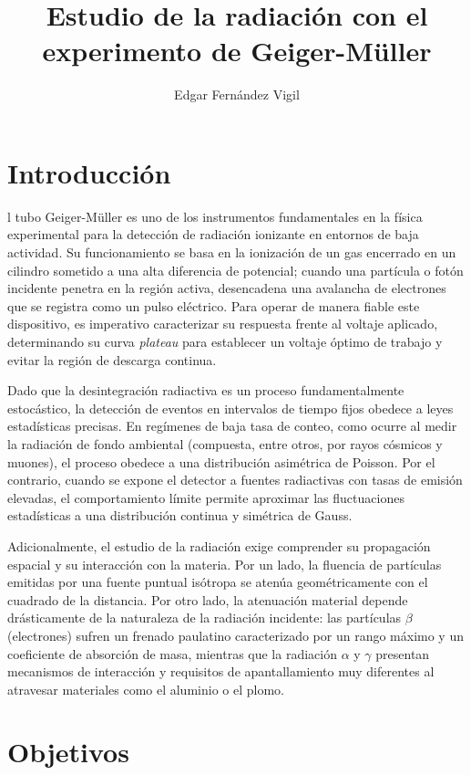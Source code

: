 \documentclass[9pt,a4paper,twocolumn,twoside]{rho-class/rho}
\title{Estudio de la radiación con el experimento de Geiger-Müller}
\author{Edgar Fernández Vigil}
\affil{Física - Facultad de Ciencias - Universidad de Oviedo}
\begin{document}
    \maketitle
    \thispagestyle{firststyle}

\section{Introducción}

l tubo Geiger-Müller es uno de los instrumentos fundamentales en la física experimental para la detección de radiación ionizante en entornos de baja actividad. %
Su funcionamiento se basa en la ionización de un gas encerrado en un cilindro sometido a una alta diferencia de potencial; cuando una partícula o fotón incidente penetra en la región activa, desencadena una avalancha de electrones que se registra como un pulso eléctrico. %
Para operar de manera fiable este dispositivo, es imperativo caracterizar su respuesta frente al voltaje aplicado, determinando su curva \textit{plateau} para establecer un voltaje óptimo de trabajo y evitar la región de descarga continua. %

Dado que la desintegración radiactiva es un proceso fundamentalmente estocástico, la detección de eventos en intervalos de tiempo fijos obedece a leyes estadísticas precisas. %
En regímenes de baja tasa de conteo, como ocurre al medir la radiación de fondo ambiental (compuesta, entre otros, por rayos cósmicos y muones), el proceso obedece a una distribución asimétrica de Poisson. %
Por el contrario, cuando se expone el detector a fuentes radiactivas con tasas de emisión elevadas, el comportamiento límite permite aproximar las fluctuaciones estadísticas a una distribución continua y simétrica de Gauss. %

Adicionalmente, el estudio de la radiación exige comprender su propagación espacial y su interacción con la materia. %
Por un lado, la fluencia de partículas emitidas por una fuente puntual isótropa se atenúa geométricamente con el cuadrado de la distancia. %
Por otro lado, la atenuación material depende drásticamente de la naturaleza de la radiación incidente: las partículas $\beta$ (electrones) sufren un frenado paulatino caracterizado por un rango máximo y un coeficiente de absorción de masa, mientras que la radiación $\alpha$ y $\gamma$ presentan mecanismos de interacción y requisitos de apantallamiento muy diferentes al atravesar materiales como el aluminio o el plomo. %

\section{Objetivos}
\end{document}
